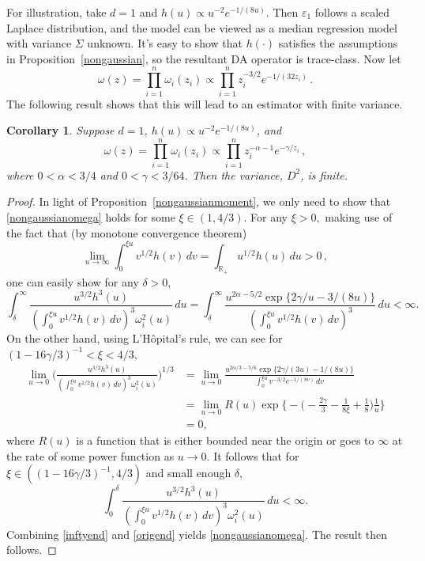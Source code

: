 \documentclass[11pt]{article}
\newtheorem{corollary}[theorem]{Corollary}
\begin{document}
	For illustration, take $d=1$ and $h(u) \propto
	u^{-2}e^{-1/(8u)}$.  Then $\varepsilon_1$ follows a scaled
	Laplace distribution, and the model can be viewed as a median
	regression model with variance $\Sigma$ unknown.  It's easy to
	show that $h(\cdot)$ satisfies the assumptions in
	Proposition~\ref{nongaussian}, so the resultant DA operator is
	trace-class.  Now let
	\[
	\omega(z) = \prod_{i=1}^{n} \omega_i(z_i) \propto
	\prod_{i=1}^{n} z_i^{-3/2} e^{-1/(32z_i)} \,.
	\]
	The following result shows that this will lead to an estimator
	with finite variance.
	\begin{corollary}
		Suppose $d=1$, $h(u) \propto u^{-2}e^{-1/(8u)}$, and 
		\[
		\omega(z) = \prod_{i=1}^{n} \omega_i(z_i) \propto
		\prod_{i=1}^{n} z_i^{-\alpha-1} e^{-\gamma/z_i} \,,
		\]
		where $0 < \alpha < 3/4$ and $0 < \gamma < 3/64$.  Then
		the variance, $D^2$, is finite.
	\end{corollary}
	\begin{proof}
		In light of Proposition~\ref{nongaussianmoment}, we only
		need to show that \eqref{nongaussianomega} holds for some
		$\xi \in (1,4/3).$ For any $\xi > 0,$ making use of the fact that (by monotone
		convergence theorem)
		\[
		\lim\limits_{u \to \infty} \int_{0}^{\xi u}
		v^{1/2}h(v) \, dv = \int_{\mathbb{R}_+} u^{1/2} h(u)
		\, du > 0 \,,
		\]
		one can easily show for any $\delta > 0$,
		\begin{equation} \label{inftyend}
		\int_{\delta}^{\infty} \frac{u^{3/2}h^3(u)} {(\int_{0}^{\xi u} v^{1/2}h(v) \, dv)^3 \omega_i^2(u) } \, du = \int_{\delta}^{\infty} \frac{u^{2\alpha-5/2}\exp\{ 2\gamma/u-3/(8u) \} } {(\int_{0}^{\xi u} v^{1/2}h(v) \, dv)^3} \, du < \infty.
		\end{equation}
		On the other hand, using L'H\^{o}pital's rule, we can see for $(1-16\gamma/3)^{-1} < \xi < 4/3,$
		\[
		\begin{aligned}
		\lim\limits_{u \to 0} \Bigg( \frac{u^{3/2}h^3(u)} {(\int_{0}^{\xi u} v^{1/2}h(v) \, dv)^3 \omega_i^2(u) } \Bigg)^{1/3} &= \lim\limits_{u \to 0} \frac{u^{2\alpha/3-5/6} \exp\{ 2\gamma/(3u)-1/(8u) \}}{ \int_{0}^{\xi u} v^{-3/2}e^{-1/(8v)}\, dv } \\
		&= \lim\limits_{u \to 0} R(u) \exp \Big\{ -\Big(-\frac{2\gamma}{3} - \frac{1}{8\xi} + \frac{1}{8} \Big)\frac{1}{u} \Big\} \\
		& = 0,
		\end{aligned}
		\]
		where $R(u)$ is a function that is either bounded near
		the origin or goes to $\infty$ at the rate of some
		power function as $u \to 0.$ It follows that for $\xi \in ((1-16\gamma/3)^{-1}, 4/3)$ and
		small enough $\delta,$
		\begin{equation} \label{origend}
		\int_{0}^{\delta} \frac{u^{3/2}h^3(u)} {(\int_{0}^{\xi u} v^{1/2}h(v) \, dv)^3 \omega_i^2(u) } \, du < \infty.
		\end{equation}
		Combining \eqref{inftyend} and \eqref{origend} yields
		\eqref{nongaussianomega}. The result then follows.
	\end{proof}
\end{document}
